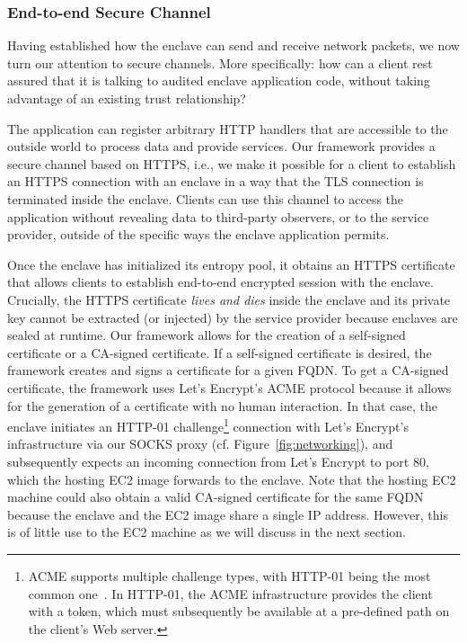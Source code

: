 \subsubsection{End-to-end Secure Channel}
\label{sec:cert}

Having established how the enclave can send and receive network packets, we now
turn our attention to secure channels.  More specifically: how can a client rest
assured that it is talking to audited enclave application code, without taking
advantage of an existing trust relationship?

The application can register arbitrary HTTP handlers that are accessible to the
outside world to process data and provide services.
Our framework provides a secure channel based on HTTPS, i.e., we make it
possible for a client to establish an HTTPS connection with an enclave in a way
that the TLS connection is terminated inside the enclave. Clients can use this
channel to access the application without revealing data to third-party
observers, or to the service provider, outside of the specific ways the enclave
application permits.

Once the enclave has
initialized its entropy pool, it obtains an HTTPS certificate that allows
clients to establish end-to-end encrypted session with the enclave.  Crucially,
the HTTPS certificate \emph{lives and dies} inside the enclave and its private
key cannot be extracted (or injected) by the service provider because enclaves
are sealed at runtime.  Our framework allows for the creation of a self-signed
certificate or a CA-signed certificate.  If a self-signed certificate is
desired, the framework creates and signs a certificate for a given FQDN.  To get
a CA-signed certificate, the framework uses Let's Encrypt's ACME protocol
because it allows for the generation of a certificate with no human interaction.
In that case, the enclave initiates an HTTP-01 challenge\footnote{ACME supports
multiple challenge types, with HTTP-01 being the most common one~\cite{http-01}.
In HTTP-01, the ACME infrastructure provides the client with a token, which must
subsequently be available at a pre-defined path on the client's Web server.}
connection with Let's Encrypt's infrastructure via our SOCKS proxy (cf.
Figure~\ref{fig:networking}), and subsequently expects an incoming connection
from Let's Encrypt to port 80, which the hosting EC2 image forwards to the
enclave.  Note that the hosting EC2 machine could also obtain a valid CA-signed
certificate for the same FQDN because the enclave and the EC2 image share a
single IP address.  However, this is of little use to the EC2 machine as we will
discuss in the next section.

